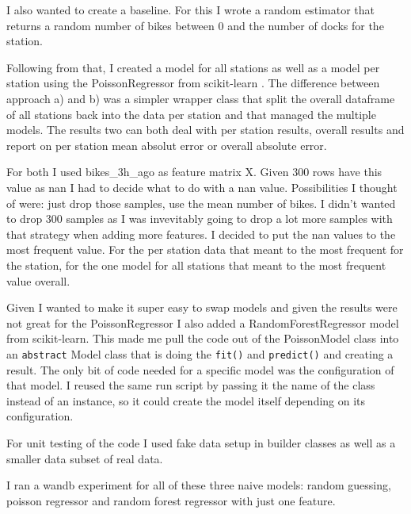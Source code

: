 \documentclass[a4paper]{article}
\begin{document}
    I also wanted to create a baseline. For this I wrote a random estimator that returns a random number of bikes between
    0 and the number of docks for the station.

    Following from that, I created a model for all stations as well as a model per station using the PoissonRegressor from
    scikit-learn \cite{scikit-learn}. The difference between approach a) and b) was a simpler wrapper class that split the
    overall dataframe of all stations back into the data per station and that managed the multiple models. The results
    two can both deal with per station results, overall results and report on per station mean absolut error or
    overall absolute error.

    For both I used bikes\_3h\_ago as feature matrix X. Given 300 rows have this value as nan I had to decide what to do
    with a nan value. Possibilities I thought of were: just drop those samples, use the mean number of bikes. I didn't wanted
    to drop 300 samples as I was invevitably going to drop a lot more samples with that strategy when adding more features.
    I decided to put the nan values to the most frequent value. For the per station data that meant to the most frequent for
    the station, for the one model for all stations that meant to the most frequent value overall.

    Given I wanted to make it super easy to swap models and given the results were not great for the PoissonRegressor
    I also added a RandomForestRegressor model from scikit-learn. This made me pull the code out of the PoissonModel class
    into an \texttt{abstract} Model class that is doing the \texttt{fit()} and \texttt{predict()} and creating a result.
    The only bit of code needed for a specific model was the configuration of that model. I reused the same run script
    by passing it the name of the class instead of an instance, so it could create the model itself depending on its configuration.

    For unit testing of the code I used fake data setup in builder classes as well as a smaller data subset of real data.

    I ran a wandb experiment for all of these three naive models: random guessing, poisson regressor and random forest
    regressor with just one feature.

\end{document}
